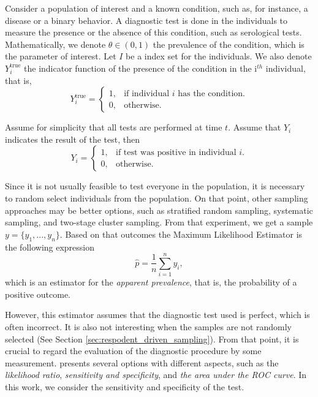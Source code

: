 Consider a population of interest and a known condition, such as, for instance,
a disease or a binary behavior. A diagnostic test is done in the individuals
to measure the presence or the absence of this condition, such as serological
tests. Mathematically, we denote $\theta \in (0,1)$ the prevalence of the
condition, which is the parameter of interest. Let $I$ be a index set for the
individuals. We also denote $Y^{\mathrm{true}}_i$ the indicator function of
the presence of the condition in the i$^{th}$ individual, that is, 
$$Y^{\mathrm{true}}_i = \begin{cases}
  1, &\text{if individual } i \text{ has the condition.} \\
  0, &\text{otherwise.}
\end{cases}$$

Assume for simplicity that all tests are performed at time $t$. Assume that
$Y_i$ indicates the result of the test, then 
$$Y_i = \begin{cases}
  1, &\text{if test was positive in individual } i. \\
  0, &\text{otherwise.}
\end{cases}$$

Since it is not usually feasible to test everyone in the population, it is
necessary to random select individuals from the population. On that point,
other sampling approaches may be better options, such as stratified random
sampling, systematic sampling, and two-stage cluster sampling. From that
experiment, we get a sample $y = \{y_1, ..., y_n\}$. Based on that outcomes the Maximum Likelihood Estimator is the following expression 
\begin{equation}
    \label{eq:naive-estimator}
    \hat{p} = \frac{1}{n}\sum_{i=1}^n y_i, 
\end{equation}
which is an estimator for the {\em apparent prevalence}, that is, the
probability of a positive outcome. 

However, this estimator assumes that the diagnostic test used is perfect,
which is often incorrect. It is also not
interesting when the samples are not randomly selected (See Section
\ref{sec:respodent_driven_sampling}). From that point, it is crucial to regard
the evaluation of the diagnostic procedure by some measurement. \textcite[p.
2]{vsimundic2009measures} presents several options with different aspects,
such as the {\em likelihood ratio}, {\em sensitivity and specificity}, and
{\em the area under the ROC curve}. In this work, we consider the sensitivity
and specificity of the test.

